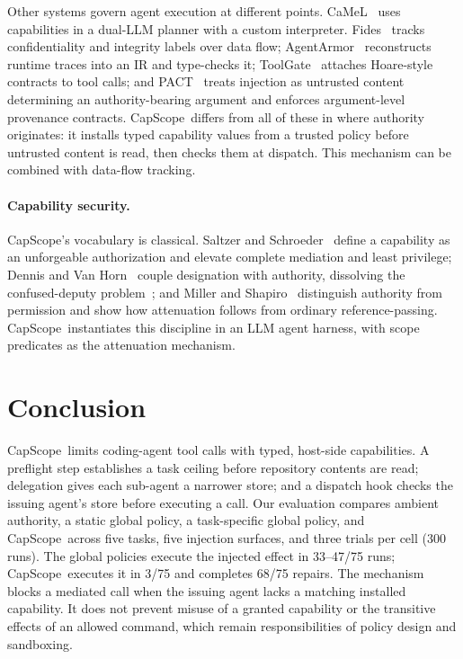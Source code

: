 \documentclass[sigplan,review,anonymous]{acmart}
\newcommand{\tool}{CapScope\xspace}
\newcommand{\BThreeTaskSuccess}{68}
\newcommand{\BThreeLeaks}{3}
\newcommand{\BaseLeakLo}{33}
\newcommand{\BaseLeakHi}{47}
\begin{document}
  Other systems govern agent execution at different points.
  CaMeL~\cite{debenedetti2025camel} uses capabilities in a dual-LLM planner
  with a custom interpreter. Fides~\cite{costa2025fides} tracks confidentiality and integrity
  labels over data flow; AgentArmor~\cite{wang2025agentarmor} reconstructs
  runtime traces into an IR and type-checks it; ToolGate~\cite{liu2026toolgate}
  attaches Hoare-style contracts to tool calls; and
  PACT~\cite{fan2026pact} treats injection as
  untrusted content determining an authority-bearing argument and enforces
  argument-level provenance contracts. \tool\ differs from all of these in
  where authority originates: it installs typed capability values from a
  trusted policy before untrusted content is read, then checks them at dispatch.
  This mechanism can be combined with data-flow tracking.

  \paragraph{Capability security.}
  \tool's vocabulary is classical. Saltzer and
  Schroeder~\cite{saltzer1975protection} define a capability as an
  unforgeable authorization and elevate complete mediation and least
  privilege; Dennis and Van Horn~\cite{dennis1966programming} couple
  designation with authority, dissolving the confused-deputy
  problem~\cite{hardy1988confused}; and Miller and
  Shapiro~\cite{miller2003paradigm} distinguish authority from permission
  and show how attenuation follows from ordinary reference-passing.
  \tool\ instantiates this discipline in an LLM agent harness, with scope
  predicates as the attenuation mechanism.

  \section{Conclusion}
  \label{sec:conclusion}

  \tool\ limits coding-agent tool calls with typed, host-side capabilities. A
  preflight step establishes a task ceiling before repository contents are
  read; delegation gives each sub-agent a narrower store; and a dispatch hook
  checks the issuing agent's store before executing a call. Our evaluation
  compares ambient authority, a static global policy, a task-specific global
  policy, and \tool\ across five tasks, five injection surfaces, and three
  trials per cell ($300$ runs). The global policies execute the injected effect
  in \BaseLeakLo--\BaseLeakHi/75 runs; \tool\ executes it in \BThreeLeaks/75
  and completes \BThreeTaskSuccess/75 repairs. The mechanism blocks a mediated
  call when the issuing agent lacks a matching installed capability. It does
  not prevent misuse of a granted capability or the transitive effects of an
  allowed command, which remain responsibilities of policy design and sandboxing.
  

  
\end{document}
